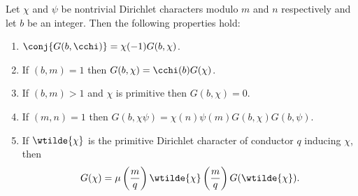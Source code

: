 \documentclass[12pt]{article}
\begin{document}
      \begin{proposition}\label{prop:Gauss_sum_reduction}
        Let \(\chi\) and \(\psi\) be nontrivial Dirichlet characters modulo \(m\) and \(n\) respectively and let \(b\) be an integer. Then the following properties hold:
        \begin{enumerate}[label*=(\roman*)]
          \item \(\conj{G(b,\cchi)} = \chi(-1)G(b,\chi)\).
          \item If \((b,m) = 1\) then \(G(b,\chi) = \cchi(b)G(\chi)\).
          \item If \((b,m) > 1\) and \(\chi\) is primitive then \(G(b,\chi) = 0\).
          \item If \((m,n) = 1\) then \(G(b,\chi\psi) = \chi(n)\psi(m)G(b,\chi)G(b,\psi)\).
          \item If \(\wtilde{\chi}\) is the primitive Dirichlet character of conductor \(q\) inducing \(\chi\), then
          \[
            G(\chi) = \mu\left(\frac{m}{q}\right)\wtilde{\chi}\left(\frac{m}{q}\right)G(\wtilde{\chi}).
          \]
        \end{enumerate}
      \end{proposition}
\end{document}
